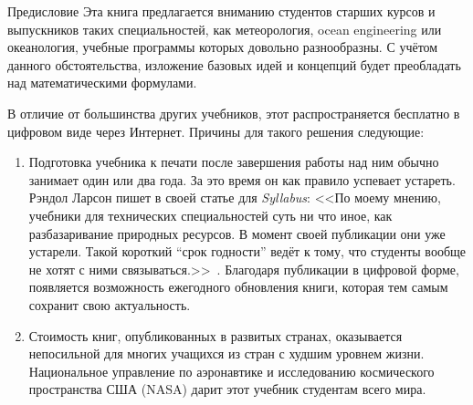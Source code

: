 \begin{chapter}{Предисловие}
Эта книга предлагается вниманию студентов старших курсов и выпускников
таких специальностей, как метеорология, ocean engineering или
океанология, учебные программы которых довольно разнообразны.  С
учётом данного обстоятельства, изложение базовых идей и концепций будет
преобладать над математическими формулами.


В отличие от большинства других учебников, этот распространяется
бесплатно в цифровом виде через Интернет. Причины для такого решения
следующие:
\begin{enumerate}

\item
Подготовка учебника к печати после завершения работы над ним обычно
занимает один или два года. За это время он как правило успевает устареть.
Рэндол Ларсон пишет в своей статье для \textit{Syllabus}: <<По моему мнению,
учебники для технических специальностей суть ни что иное, как разбазаривание
природных ресурсов. В момент своей публикации они уже устарели.
Такой короткий ``срок годности'' ведёт к тому, что студенты вообще не хотят
с ними связываться.>>~\cite{Larson:2002}.
Благодаря публикации в цифровой форме, появляется возможность ежегодного
обновления книги, которая тем самым сохранит свою актуальность.

\item
Стоимость книг, опубликованных в развитых странах, оказывается
непосильной для многих учащихся из стран с худшим уровнем жизни.
Национальное управление по аэронавтике и исследованию космического
пространства США (NASA) дарит этот учебник студентам всего
мира.
\end{enumerate}


\end{chapter}
